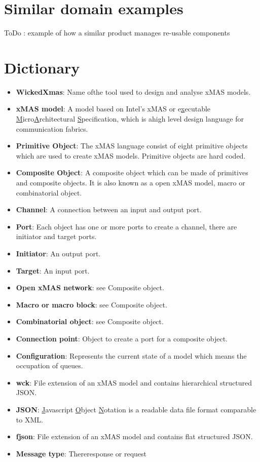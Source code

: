 \documentclass[a4paper,11pt,final]{article}
\begin{document}
\newpage
\section{Similar domain examples}
ToDo : example of how a similar product manages re-usable components

\newpage
\section{Dictionary}
\begin{itemize}
	\item \textbf{WickedXmas}: Name ofthe tool used to design and analyse xMAS models.
	\item \textbf{xMAS model}:
	A model based on Intel's xMAS or e\underline{x}ecutable \underline{M}icro\underline{A}rchitectural \underline{S}pecification,
	which is ahigh level design language for communication fabrics.
	\item \textbf{Primitive Object}: The xMAS language consist of eight primitive objects which are used to create xMAS models.
	Primitive objects are hard coded.
	\item \textbf{Composite Object}: A composite object which can be made of primitives and composite objects.
	It is also known as a open xMAS model, macro or combinatorial object.
	\item \textbf{Channel}: A connection between an input and output port.
	\item \textbf{Port}: Each object has one or more ports to create a channel, there are initiator and target ports.
	\item \textbf{Initiator}: An output port.
	\item \textbf{Target}: An input port.
	\item \textbf{Open xMAS network}: see Composite object.
	\item \textbf{Macro or macro block}: see Composite object.
	\item \textbf{Combinatorial object}: see Composite object.
	\item \textbf{Connection point}: Object to create a port for a composite object.
	\item \textbf{Configuration}: Represents the current state of a model which means the occupation of queues.
	\item \textbf{wck}: File extension of an xMAS model and contains hierarchical structured JSON.
	\item \textbf{JSON}: \underline{J}avascript \underline{O}bject \underline{N}otation is a readable data file format comparable to XML.
	\item \textbf{fjson}: File extension of an xMAS model and contains flat structured JSON.
	\item \textbf{Message type}: Thereresponse or request
\end{itemize}
\end{document}
